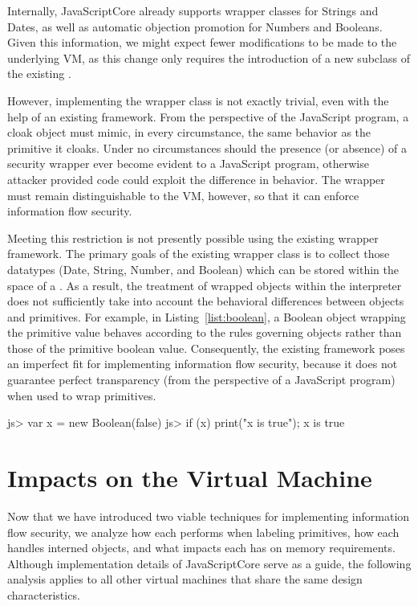 Internally, JavaScriptCore already supports wrapper classes for Strings and Dates, as well as automatic objection promotion for Numbers and Booleans.
Given this information, we might expect fewer modifications to be made to the underlying VM, as this change only requires the introduction of a new subclass of the existing .

However, implementing the wrapper class is not exactly trivial, even with the help of an existing framework.
From the perspective of the JavaScript program, a cloak object must mimic, in every circumstance, the same behavior as the primitive it cloaks.
Under no circumstances should the presence (or absence) of a security wrapper ever become evident to a JavaScript program, otherwise attacker provided code could exploit the difference in behavior.
The wrapper must remain distinguishable to the VM, however, so that it can enforce information flow security.

Meeting this restriction is not presently possible using the existing wrapper framework.
The primary goals of the existing wrapper class is to collect those datatypes (Date, String, Number, and Boolean) which can be stored within the space of a .
As a result, the treatment of wrapped objects within the interpreter does not sufficiently take into account the behavioral differences between objects and primitives.
For example, in Listing~\ref{list:boolean}, a Boolean object wrapping the primitive value  behaves according to the rules governing objects rather than those of the primitive boolean value.
Consequently, the existing framework poses an imperfect fit for implementing information flow security, because it does not guarantee perfect transparency (from the perspective of a JavaScript program) when used to wrap primitives.

\begin{jscode}
js> var x = new Boolean(false)
js> if (x) { print("x is true"); }
    x is true
\end{jscode}

\section{Impacts on the Virtual Machine}
\label{sec:analysis}

Now that we have introduced two viable techniques for implementing information flow security, we analyze how each performs when labeling primitives, how each handles interned objects, and what impacts each has on memory requirements.
Although implementation details of JavaScriptCore serve as a guide, the following analysis applies to all other virtual machines that share the same design characteristics.

